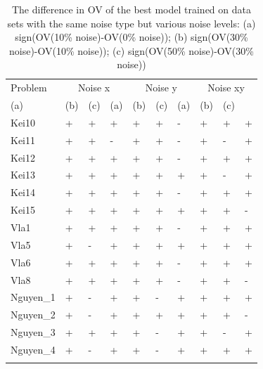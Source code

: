 \begin{table}
\caption{The difference in OV of the best model trained on data sets with the same noise type but various noise levels: (a) sign(OV(10\% noise)-OV(0\% noise)); (b) sign(OV(30\% noise)-OV(10\% noise)); (c) sign(OV(50\% noise)-OV(30\% noise)) }
\label{tab:difOV1}       %
\begin{tabular}{l|lll|lll|lll}
\hline\noalign{\smallskip}
Problem &\multicolumn{3}{|c|}{Noise x} & \multicolumn{3}{c|}{Noise y} & \multicolumn{3}{c}{Noise xy} \\
(a) & (b) & (c) & (a) & (b) & (c) & (a) & (b) & (c)\\
\noalign{\smallskip}\hline\noalign{\smallskip}
Kei10 & + & + & + & + & + & - & + & + & + \\
Kei11 & + & + & - & + & + & - & + & - & + \\
Kei12 & + & + & + & + & + & - & + & + & + \\
Kei13 & + & + & + & + & + & + & + & - & + \\
Kei14 & + & + & + & + & + & - & + & + & + \\
Kei15 & + & + & + & + & + & + & + & + & - \\
Vla1 & + & + & + & + & + & - & + & + & + \\
Vla5 & + & - & + & + & + & + & + & + & + \\
Vla6 & + & + & + & + & + & - & + & + & + \\
Vla8 & + & + & + & + & + & - & + & + & - \\
Nguyen\_1 & + & - & + & + & - & + & + & + & + \\
Nguyen\_2 & + & - & + & + & + & + & + & + & - \\
Nguyen\_3 & + & + & + & + & - & + & + & - & + \\
Nguyen\_4 & + & - & + & + & - & + & + & + & + \\
\noalign{\smallskip}\hline
\end{tabular}
\end{table}
